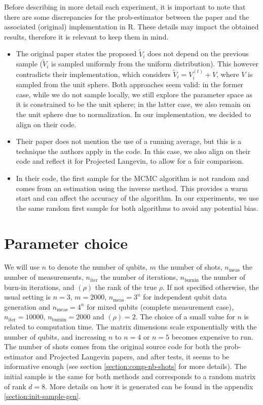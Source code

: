 \documentclass[12pt]{memoir}
\newcommand{\nmeasn}[1]{$n_{\text{meas}}=#1$}
\newcommand{\nitern}[1]{$n_{\text{iter}}=#1$}
\newcommand{\nburninn}[1]{$n_{\text{burnin}}=#1$}
\newcommand{\rhorankn}[1]{\text{rank}$(\rho)=#1$}
\newcommand{\nmeas}[0]{$n_{\text{meas}} $ }
\newcommand{\niter}[0]{$n_{\text{iter}} $ }
\newcommand{\nburnin}[0]{$n_{\text{burnin}} $ }
\newcommand{\rhorank}[0]{\text{rank}$(\rho) $ }
\begin{document}
Before describing in more detail each experiment, it is important to note that there are some discrepancies for the prob-estimator between the paper and the associated (original) implementation in R. These details may impact the obtained results, therefore it is relevant to keep them in mind.

\begin{itemize}

\item The original paper states the proposed $\tilde V_i$ does not depend on the previous sample ($\tilde V_i$ is sampled uniformly from the uniform distribution). This however contradicts their implementation, which considers $\tilde V_i = V_i^{(t)} + V$, where $V$ is sampled from the unit sphere. Both approaches seem valid: in the former case, while we do not sample locally, we still explore the parameter space as it is constrained to be the unit sphere; in the latter case, we also remain on the unit sphere due to normalization. In our implementation, we decided to align on their code.

\item Their paper does not mention the use of a running average, but this is a technique the authors apply in the code. In this case, we also align on their code and reflect it for Projected Langevin, to allow for a fair comparison.

\item In their code, the first sample for the MCMC algorithm is not random and comes from an estimation using the inverse method. This provides a warm start and can affect the accuracy of the algorithm. In our experiments, we use the same random first sample for both algorithms to avoid any potential bias.

\end{itemize}



\section{Parameter choice}

We will use $n$ to denote the number of qubits, $m$ the number of shots, \nmeas the number of measurements, \niter the number of iterations, \nburnin the number of burn-in iterations, and \rhorank the rank of the true $\rho$. If not specified otherwise, the usual setting is $n=3$, $m=2000$, \nmeasn{3^n} for independent qubit data generation and \nmeasn{4^n} for mixed qubits (complete measurement case), \nitern{10000}, \nburninn{2000} and \rhorankn{2}. The choice of a small value for $n$ is related to computation time. The matrix dimensions scale exponentially with the number of qubits, and increasing $n$ to $n=4$ or $n=5$ becomes expensive to run. The number of shots comes from the original source code for both the prob-estimator and Projected Langevin papers, and after tests, it seems to be informative enough (see section \ref{section:comp-nb-shots} for more details). The initial sample is the same for both methods and corresponds to a random matrix of rank $d=8$. More details on how it is generated can be found in the appendix \ref{section:init-sample-gen}.\medbreak
\end{document}
